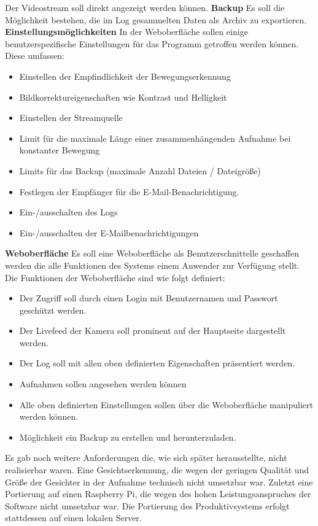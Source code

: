Der Videostream soll direkt angezeigt werden können.
\newline
\textbf{Backup}\newline
Es soll die Möglichkeit bestehen, die im Log gesammelten Daten als Archiv zu exportieren.
\newline
\textbf{Einstellungsmöglichkeiten}\newline
In der Weboberfläche sollen einige benutzerspezifische Einstellungen für das Programm getroffen werden können.
Diese umfassen: 
\begin{itemize}
\item Einstellen der Empfindlichkeit der Bewegungserkennung
\item Bildkorrektureigenschaften wie Kontrast und Helligkeit
\item Einstellen der Streamquelle
\item Limit für die maximale Länge einer zusammenhängenden Aufnahme bei konstanter Bewegung
\item Limits für das Backup (maximale Anzahl Dateien / Dateigröße)
\item Festlegen der Empfänger für die E-Mail-Benachrichtigung.
\item Ein-/ausschalten des Logs
\item Ein-/ausschalten der E-Mailbenachrichtigungen
\end{itemize}
\textbf{Weboberfläche}\newline
Es soll eine Weboberfläche als Benutzerschnittelle geschaffen werden die alle Funktionen des Systems einem Anwender zur Verfügung stellt.
Die Funktionen der Weboberfläche sind wie folgt definiert:
\begin{itemize}
\item Der Zugriff soll durch einen Login mit Benutzernamen und Passwort geschützt werden.
\item Der Livefeed der Kamera soll prominent auf der Hauptseite dargestellt werden.
\item Der Log soll mit allen oben definierten Eigenschaften präsentiert werden.
\item Aufnahmen sollen angesehen werden können
\item Alle oben definierten Einstellungen sollen über die Weboberfläche manipuliert werden können.
\item Möglichkeit ein Backup zu erstellen und herunterzuladen.
\end{itemize}
Es gab noch weitere Anforderungen die, wie sich später herausstellte, nicht realisierbar waren. Eine Gesichtserkennung, die wegen der geringen Qualität und Größe der Gesichter in der Aufnahme technisch nicht umsetzbar war.  Zuletzt eine Portierung auf einen Raspberry Pi, die wegen des hohen Leistungsanspruches der Software nicht umsetzbar war. Die Portierung des Produktivsystems erfolgt stattdessen auf einen lokalen Server.
 
